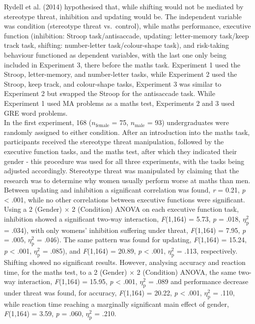 \documentclass[
  stu,floatsintext]{apa7}
\begin{document}
Rydell et al. (2014) hypothesised that, while shifting would not be mediated by stereotype threat, inhibition and updating would be.
The independent variable was condition (stereotype threat vs.~control), while maths performance, executive function (inhibition: Stroop task/antisaccade, updating: letter-memory task/keep track task, shifting: number-letter task/colour-shape task), and risk-taking behaviour functioned as dependent variables, with the last one only being included in Experiment 3, there before the maths task.
Experiment 1 used the Stroop, letter-memory, and number-letter tasks, while Experiment 2 used the Stroop, keep track, and colour-shape tasks, Experiment 3 was similar to Experiment 2 but swapped the Stroop for the antisaccade task.
While Experiment 1 used MA problems as a maths test, Experiments 2 and 3 used GRE word problems.\\
In the first experiment, 168 (\(n_{\text{female}}\) = 75, \(n_{\text{male}}\) = 93) undergraduates were randomly assigned to either condition.
After an introduction into the maths task, participants received the stereotype threat manipulation, followed by the executive function tasks, and the maths test, after which they indicated their gender - this procedure was used for all three experiments, with the tasks being adjusted accordingly.
Stereotype threat was manipulated by claiming that the research was to determine why women usually perform worse at maths than men.\\
Between updating and inhibition a significant correlation was found, \emph{r} = 0.21, \emph{p} \textless{} .001, while no other correlations between executive functions were significant.
Using a 2 (Gender) \(\times\) 2 (Condition) ANOVA on each executive function task, inhibition showed a significant two-way interaction, \emph{F}(1,164) = 5.73, \emph{p} = .018, \(\eta^{2}_{\text{p}}\) = .034), with only womens' inhibition suffering under threat, \emph{F}(1,164) = 7.95, \emph{p} = .005, \(\eta^{2}_{\text{p}}\) = .046).
The same pattern was found for updating, \emph{F}(1,164) = 15.24, \emph{p} \textless{} .001, \(\eta^{2}_{\text{p}}\) = .085), and \emph{F}(1,164) = 20.89, \emph{p} \textless{} .001, \(\eta^{2}_{\text{p}}\) = .113, respectively.
Shifting showed no significant results.
However, analysing accuracy and reaction time, for the maths test, to a 2 (Gender) \(\times\) 2 (Condition) ANOVA, the same two-way interaction, \emph{F}(1,164) = 15.95, \emph{p} \textless{} .001, \(\eta^{2}_{\text{p}}\) = .089 and performance decrease under threat was found, for accuracy, \emph{F}(1,164) = 20.22, \emph{p} \textless{} .001, \(\eta^{2}_{\text{p}}\) = .110, while reaction time reaching a marginally significant main effect of gender, \emph{F}(1,164) = 3.59, \emph{p} = .060, \(\eta^{2}_{\text{p}}\) = .210.
\end{document}
